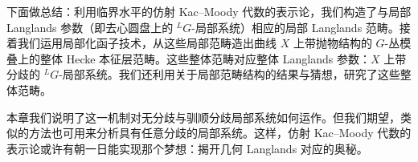 
下面做总结：利用临界水平的仿射 Kac--Moody 代数的表示论，我们构造了与局部 Langlands 参数（即去心圆盘上的 ${}^L G$-局部系统）相应的局部 Langlands 范畴。接着我们运用局部化函子技术，从这些局部范畴造出曲线 $X$ 上带抛物结构的 $G$-丛模叠上的整体 Hecke 本征层范畴。这些整体范畴对应整体 Langlands 参数：$X$ 上带分歧的 ${}^L G$-局部系统。我们还利用关于局部范畴结构的结果与猜想，研究了这些整体范畴。

本章我们说明了这一机制对无分歧与驯顺分歧局部系统如何运作。但我们期望，类似的方法也可用来分析具有任意分歧的局部系统。这样，仿射 Kac--Moody 代数的表示论或许有朝一日能实现那个梦想：揭开几何 Langlands 对应的奥秘。

